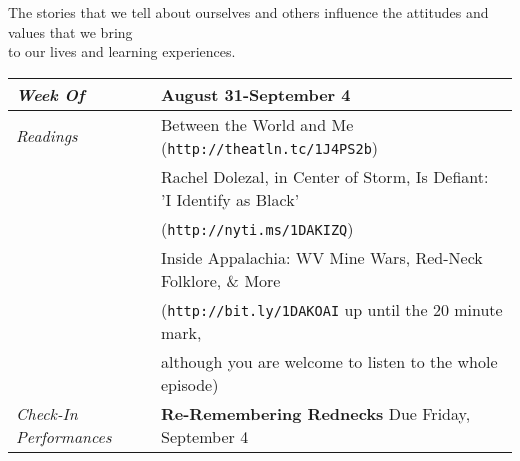 \documentclass{article}
\newcommand{\gentopic}[1]{\begin{center}\faKey\hspace{1em}\textsf{#1}\end{center}}
\newcommand{\tabread}{\faBook\hspace{1em}\textit{Readings}}
\newcommand{\tabdt}{\faCalendar\hspace{1em}\textit{Week Of}}
\newcommand{\tabcheckin}{\raggedright\faCheckSquareO\hspace{1em}\textit{Check-In Performances}}
\newenvironment{tabsched}
	{\small
	\begin{tabular}{p{1.5in}p{4.5in}}
	\midrule}
	{\midrule
	\end{tabular}
	\normalsize}
\newcommand{\weekthree}{August 31-September 4}
\newcommand{\url}[1]{\footnotesize\texttt{#1}\normalsize}
\begin{document}
\gentopic{The stories that we tell about ourselves and others influence the attitudes and values that we bring\\to our lives and learning experiences.}

\begin{tabsched}
	\tabdt & \weekthree \\
	\midrule
	\tabread & Between the World and Me (\url{http://theatln.tc/1J4PS2b}) \\
	& Rachel Dolezal, in Center of Storm, Is Defiant: 'I Identify as Black' \\
	& (\url{http://nyti.ms/1DAKIZQ}) \\
	& Inside Appalachia: WV Mine Wars, Red-Neck Folklore, \& More \\
	& (\url{http://bit.ly/1DAKOAI} up until the 20 minute mark, \\
	& although you are welcome to listen to the whole episode) \\
	\midrule
	\tabcheckin & \textbf{Re-Remembering Rednecks} Due Friday, September 4 \\ %
\end{tabsched}
\end{document}
